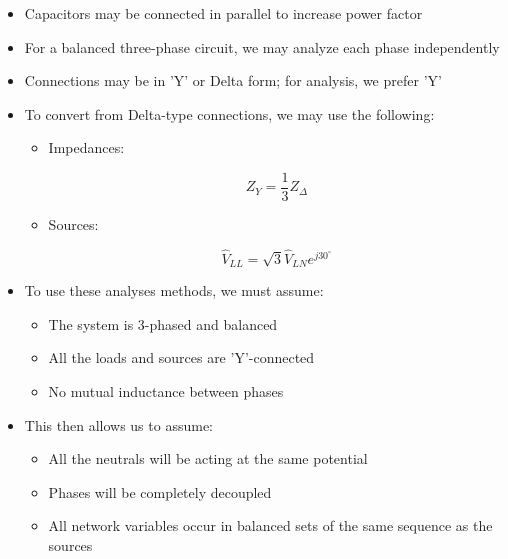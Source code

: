 \begin{itemize}

  \item Capacitors may be connected in parallel to increase power factor

  \item For a balanced three-phase circuit, we may analyze each phase independently

  \item Connections may be in 'Y' or Delta form; for analysis, we prefer 'Y'

  \item To convert from Delta-type connections, we may use the following:

    \begin{itemize}

      \item Impedances:

        $$Z_Y=\frac{1}{3}Z_{\Delta}$$

      \item Sources:

        $$\hat{V}_{LL}=\sqrt{3}\hat{V}_{LN}e^{j30^{\circ}}$$

    \end{itemize}

  \item To use these analyses methods, we must assume:

    \begin{itemize}

      \item The system is 3-phased and balanced

      \item All the loads and sources are 'Y'-connected

      \item No mutual inductance between phases

    \end{itemize}

  \item This then allows us to assume:
    
    \begin{itemize}

      \item All the neutrals will be acting at the same potential

      \item Phases will be completely decoupled

      \item All network variables occur in balanced sets of the same sequence as the sources

    \end{itemize}

\end{itemize}



